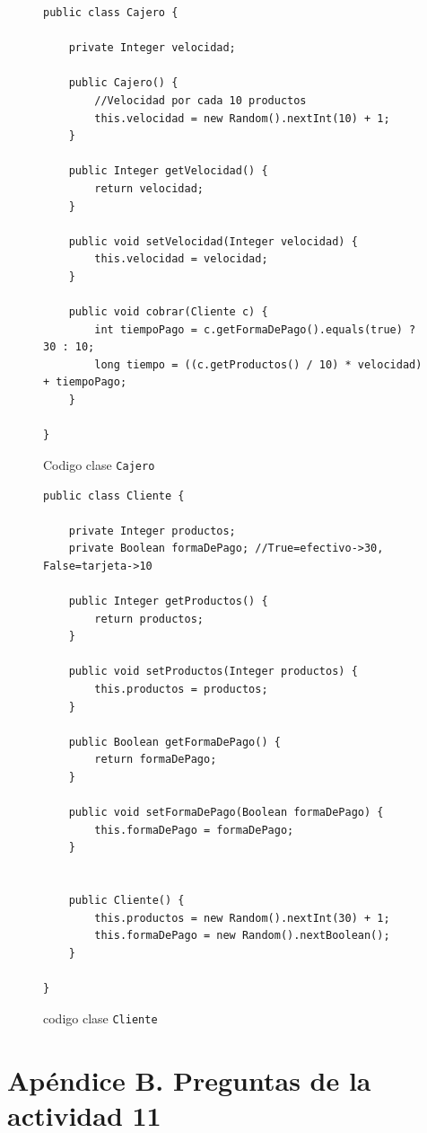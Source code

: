 \documentclass[11pt]{article}
\begin{document}
\begin{figure}[h]

\begin{lstlisting}
public class Cajero {

    private Integer velocidad;

    public Cajero() {
        //Velocidad por cada 10 productos
        this.velocidad = new Random().nextInt(10) + 1;
    }

    public Integer getVelocidad() {
        return velocidad;
    }

    public void setVelocidad(Integer velocidad) {
        this.velocidad = velocidad;
    }

    public void cobrar(Cliente c) {
        int tiempoPago = c.getFormaDePago().equals(true) ? 30 : 10;
        long tiempo = ((c.getProductos() / 10) * velocidad) + tiempoPago;
    }

}

\end{lstlisting}
\caption{Codigo clase \texttt{Cajero}}
\end{figure}
\newpage
\begin{figure}[h]
\begin{lstlisting}
public class Cliente {

    private Integer productos;
    private Boolean formaDePago; //True=efectivo->30, False=tarjeta->10

    public Integer getProductos() {
        return productos;
    }

    public void setProductos(Integer productos) {
        this.productos = productos;
    }

    public Boolean getFormaDePago() {
        return formaDePago;
    }

    public void setFormaDePago(Boolean formaDePago) {
        this.formaDePago = formaDePago;
    }

    
    public Cliente() {
        this.productos = new Random().nextInt(30) + 1;
        this.formaDePago = new Random().nextBoolean();
    }

}
\end{lstlisting}
\caption{codigo clase \texttt{Cliente}}
\end{figure}

\newpage

\section{Apéndice B. Preguntas de la actividad 11}
\end{document}
